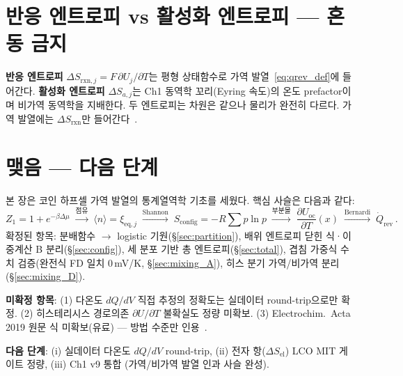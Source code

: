 \documentclass[11pt,a4paper]{article}
\newcommand{\rxn}{\mathrm{rxn}}
\newcommand{\eq}{\mathrm{eq}}
\newcommand{\rev}{\mathrm{rev}}
\newcommand{\oc}{\mathrm{oc}}
\newcommand{\config}{\mathrm{config}}
\newcommand{\el}{\mathrm{el}}
\begin{document}
\section{반응 엔트로피 vs 활성화 엔트로피 --- 혼동 금지}\label{sec:caveat}

\textbf{반응 엔트로피} $\Delta S_{\rxn,j}=F\,\partial U_j/\partial T$는 평형 상태함수로
가역 발열~\eqref{eq:qrev_def}에 들어간다.
\textbf{활성화 엔트로피} $\Delta S_{a,j}$는 Ch1 동역학 꼬리(Eyring 속도)의
온도 prefactor이며 비가역 동역학을 지배한다.
두 엔트로피는 차원은 같으나 물리가 완전히 다르다.
가역 발열에는 $\Delta S_{\rxn}$만 들어간다~\cite{msmr_partI}.

\section*{맺음 --- 다음 단계}

본 장은 코인 하프셀 가역 발열의 통계열역학 기초를 세웠다.
핵심 사슬은 다음과 같다:
\[
  Z_1=1+e^{-\beta\Delta\mu}
  \;\xrightarrow{\text{점유}}\;
  \langle n\rangle = \xi_{\eq,j}
  \;\xrightarrow{\text{Shannon}}\;
  S_\config = -R\sum p\ln p
  \;\xrightarrow{\text{부분몰}}\;
  \frac{\partial U_{\oc}}{\partial T}(x)
  \;\xrightarrow{\text{Bernardi}}\;
  \dot{Q}_{\rev}\,.
\]
확정된 항목:
분배함수 $\to$ logistic 기원(\S\ref{sec:partition}),
배위 엔트로피 닫힌 식·이중계산 B 분리(\S\ref{sec:config}),
세 분포 기반 총 엔트로피(\S\ref{sec:total}),
겹침 가중식 수치 검증(완전식 FD 일치 0\,mV/K, \S\ref{sec:mixing_A}),
히스 분기 가역/비가역 분리(\S\ref{sec:mixing_D}).

\textbf{미확정 항목}:
(1) 다온도 $dQ/dV$ 직접 추정의 정확도는 실데이터 round-trip으로만 확정.
(2) 히스테리시스 경로의존 $\partial U/\partial T$ 불확실도 정량 미확보.
(3) Electrochim.\ Acta 2019 원문 식 미확보(유료) --- 방법 수준만 인용~\cite{occupation2019}.

\textbf{다음 단계}:
(i) 실데이터 다온도 $dQ/dV$ round-trip,
(ii) 전자 항($\Delta S_\el$) LCO MIT 게이트 정량,
(iii) Ch1 v9 통합 (가역/비가역 발열 인과 사슬 완성).
\end{document}
